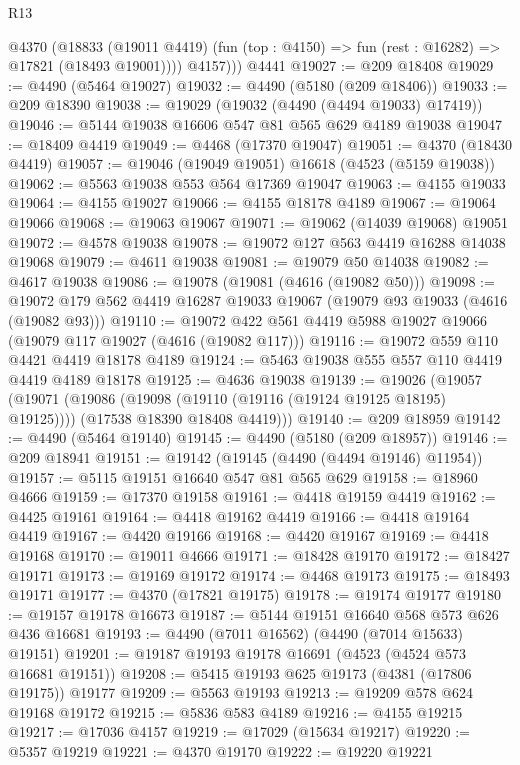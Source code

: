 \begin{lexlean}{R13}
\begin{coremodule}
        @4370
          (@18833
            (@19011 @4419)
            (fun (top : @4150) => fun (rest : @16282) => @17821 (@18493 @19001))))
          @4157)))
    @4441
@19027 := @209 @18408
@19029 := @4490 (@5464 @19027)
@19032 := @4490 (@5180 (@209 @18406))
@19033 := @209 @18390
@19038 := @19029 (@19032 (@4490 (@4494 @19033) @17419))
@19046 := @5144 @19038 @16606 @547 @81 @565 @629 @4189 @19038
@19047 := @18409 @4419
@19049 := @4468 (@17370 @19047)
@19051 := @4370 (@18430 @4419)
@19057 := @19046 (@19049 @19051) @16618 (@4523 (@5159 @19038))
@19062 := @5563 @19038 @553 @564 @17369 @19047
@19063 := @4155 @19033
@19064 := @4155 @19027
@19066 := @4155 @18178 @4189
@19067 := @19064 @19066
@19068 := @19063 @19067
@19071 := @19062 (@14039 @19068) @19051
@19072 := @4578 @19038
@19078 := @19072 @127 @563 @4419 @16288 @14038 @19068
@19079 := @4611 @19038
@19081 := @19079 @50 @14038
@19082 := @4617 @19038
@19086 := @19078 (@19081 (@4616 (@19082 @50)))
@19098 := @19072 @179 @562 @4419 @16287 @19033 @19067 (@19079 @93 @19033 (@4616 (@19082 @93)))
@19110 := @19072 @422 @561 @4419 @5988 @19027 @19066 (@19079 @117 @19027 (@4616 (@19082 @117)))
@19116 := @19072 @559 @110 @4421 @4419 @18178 @4189
@19124 := @5463 @19038 @555 @557 @110 @4419 @4419 @4189 @18178
@19125 := @4636 @19038
@19139 := @19026
    (@19057
      (@19071
        (@19086 (@19098 (@19110 (@19116 (@19124 @19125 @18195) @19125))))
        (@17538 @18390 @18408 @4419)))
@19140 := @209 @18959
@19142 := @4490 (@5464 @19140)
@19145 := @4490 (@5180 (@209 @18957))
@19146 := @209 @18941
@19151 := @19142 (@19145 (@4490 (@4494 @19146) @11954))
@19157 := @5115 @19151 @16640 @547 @81 @565 @629
@19158 := @18960 @4666
@19159 := @17370 @19158
@19161 := @4418 @19159 @4419
@19162 := @4425 @19161
@19164 := @4418 @19162 @4419
@19166 := @4418 @19164 @4419
@19167 := @4420 @19166
@19168 := @4420 @19167
@19169 := @4418 @19168
@19170 := @19011 @4666
@19171 := @18428 @19170
@19172 := @18427 @19171
@19173 := @19169 @19172
@19174 := @4468 @19173
@19175 := @18493 @19171
@19177 := @4370 (@17821 @19175)
@19178 := @19174 @19177
@19180 := @19157 @19178 @16673
@19187 := @5144 @19151 @16640 @568 @573 @626 @436 @16681
@19193 := @4490 (@7011 @16562) (@4490 (@7014 @15633) @19151)
@19201 := @19187 @19193 @19178 @16691 (@4523 (@4524 @573 @16681 @19151))
@19208 := @5415 @19193 @625 @19173 (@4381 (@17806 @19175)) @19177
@19209 := @5563 @19193
@19213 := @19209 @578 @624 @19168 @19172
@19215 := @5836 @583 @4189
@19216 := @4155 @19215
@19217 := @17036 @4157
@19219 := @17029 (@15634 @19217)
@19220 := @5357 @19219
@19221 := @4370 @19170
@19222 := @19220 @19221

\end{coremodule}
\end{lexlean}
